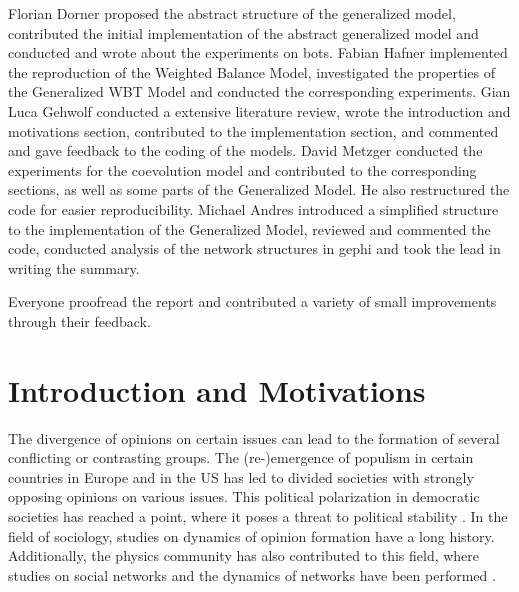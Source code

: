 \documentclass[11pt]{article}
\begin{document}
Florian Dorner proposed the abstract structure of the generalized model, contributed the initial implementation of the abstract generalized model and conducted and wrote about the experiments on bots. Fabian Hafner implemented the reproduction of the Weighted Balance Model, investigated the properties of the Generalized WBT Model and conducted the corresponding experiments. Gian Luca Gehwolf conducted a extensive literature review, wrote the introduction and motivations section, contributed to the implementation section, and commented and gave feedback to the coding of the models. David Metzger conducted the experiments for the coevolution model and contributed to the corresponding sections, as well as some parts of the Generalized Model. He also restructured the code for easier reproducibility. Michael Andres introduced a simplified structure to the implementation of the Generalized Model, reviewed and commented the code, conducted analysis of the network structures in gephi and took the lead in writing the summary.

Everyone proofread the report and contributed a variety of small improvements through their feedback. 

\section{Introduction and Motivations}

The divergence of opinions on certain issues can lead to the formation of several conflicting or contrasting groups. The (re-)emergence of populism in certain countries in Europe and in the US has led to divided societies with strongly opposing opinions on various issues. This political polarization in democratic societies has reached a point, where it poses a threat to political stability \citep{abramowitz2008,hare2014}. In the field of sociology, studies on dynamics of opinion formation have a long history. Additionally, the physics community has also contributed to this field, where studies on social networks and the dynamics of networks have been performed \citep{helbing1994,laguna2004,hegselmann2002,holme2006nonequilibrium}.
\end{document}
